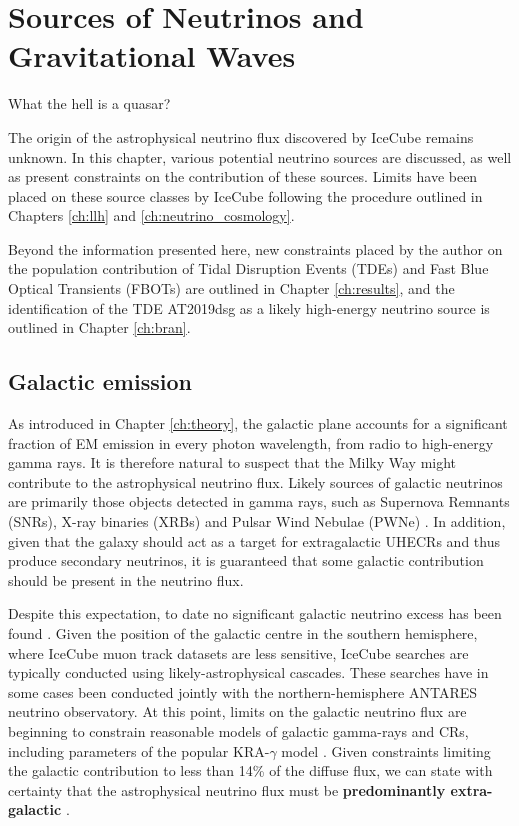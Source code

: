 \setchapterpreamble[u]{\margintoc}
\chapter{Sources of Neutrinos and Gravitational Waves}

\begin{fquote} What the hell is a quasar?
\end{fquote}


The origin of the astrophysical neutrino flux discovered by IceCube remains unknown. In this chapter, various potential neutrino sources are discussed, as well as present constraints on the contribution of these sources. Limits have been placed on these source classes by IceCube following the procedure outlined in Chapters \ref{ch:llh} and \ref{ch:neutrino_cosmology}.

Beyond the information presented here, new constraints placed by the author on the population contribution of Tidal Disruption Events (TDEs) and Fast Blue Optical Transients (FBOTs) are outlined in Chapter \ref{ch:results}, and the identification of the TDE AT2019dsg as a likely high-energy neutrino source is outlined in Chapter \ref{ch:bran}.

\section{Galactic emission}

As introduced in Chapter \ref{ch:theory}, the galactic plane accounts for a significant fraction of EM emission in every photon wavelength, from radio to high-energy gamma rays. It is therefore natural to suspect that the Milky Way might contribute to the astrophysical neutrino flux. Likely sources of galactic neutrinos are primarily those objects detected in gamma rays, such as Supernova Remnants (SNRs), X-ray binaries (XRBs) and Pulsar Wind Nebulae (PWNe) . In addition, given that the galaxy should act as a target for extragalactic UHECRs and thus produce secondary neutrinos, it is guaranteed that some galactic contribution should be present in the neutrino flux. 

Despite this expectation, to date no significant galactic neutrino excess has been found . Given the position of the galactic centre in the southern hemisphere, where IceCube muon track datasets are less sensitive, IceCube searches are typically conducted using likely-astrophysical cascades. These searches have in some cases been conducted jointly with the northern-hemisphere ANTARES neutrino observatory. At this point, limits on the galactic neutrino flux are beginning to constrain reasonable models of galactic gamma-rays and CRs, including parameters of the popular KRA-$\gamma$ model . Given constraints limiting the galactic contribution to less than 14\% of the diffuse flux, we can state with certainty that the astrophysical neutrino flux must be \textbf{predominantly extra-galactic} \cite{ic_17_galactic}. 


